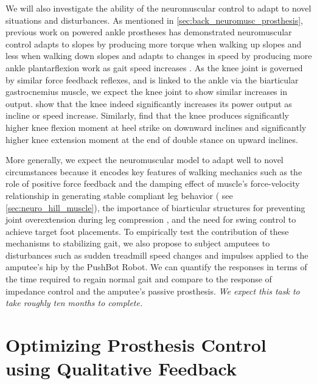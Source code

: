 We will also investigate the ability of the neuromuscular control to adapt to
novel situations and disturbances. As mentioned in
\cref{sec:back_neuromusc_prosthesis}, previous work on powered ankle prostheses
has demonstrated neuromuscular control adapts to slopes by producing more torque
when walking up slopes and less when walking down slopes
\citep{eilenberg2010control} and adapts to changes in speed by producing more
ankle plantarflexion work as gait speed increases \citep{markowitz2011speed}. As
the knee joint is governed by similar force feedback reflexes, and is linked to
the ankle via the biarticular gastrocnemius muscle, we expect the knee joint to
show similar increases in output. \citet{chen1997influence} show that the knee
indeed significantly increases its power output as incline or speed increase.
Similarly, \citet{mcintosh2006gait} find that the knee produces significantly
higher knee flexion moment at heel strike on downward inclines and significantly
higher knee extension moment at the end of double stance on upward inclines.

More generally, we expect the neuromuscular model to adapt well to novel
circumstances because it encodes key features of walking mechanics such as the
role of positive force feedback and the damping effect of muscle's
force-velocity relationship in generating stable compliant leg behavior
(\citep{grey2007positive} see \cref{sec:neuro_hill_muscle}), the importance of
biarticular structures for preventing joint overextension during leg compression
\citep{seyfarth2001stable}, and the need for swing control to achieve target
foot placements. To empirically test the contribution of these mechanisms to
stabilizing gait, we also propose to subject amputees to disturbances such as
sudden treadmill speed changes and impulses applied to the amputee's hip by the
PushBot Robot. We can quantify the responses in terms of the time required to
regain normal gait and compare to the response of impedance control and the
amputee's passive prosthesis. \emph{We expect this task to take roughly ten
months to complete.}

\section{Optimizing Prosthesis Control using Qualitative
Feedback}\label{sec:proposed_optimize}


